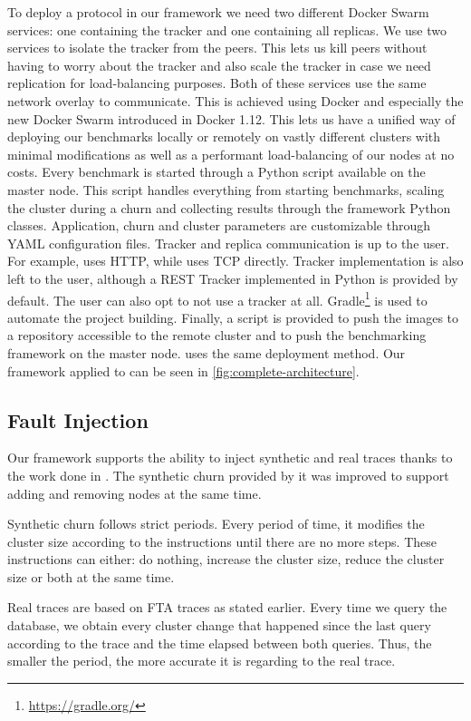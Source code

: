 To deploy a protocol in our framework we need two different Docker Swarm services: one containing the tracker and one containing all replicas. We use two services to isolate the tracker from the peers. This lets us kill peers without having to worry about the tracker and also scale the tracker in case we need replication for load-balancing purposes. Both of these services use the same network overlay to communicate. This is achieved using Docker and especially the new Docker Swarm introduced in Docker 1.12. This lets us have a unified way of deploying our benchmarks locally or remotely on vastly different clusters with minimal modifications as well as a performant load-balancing of our nodes at no costs. Every benchmark is started through a Python script available on the master node. This script handles everything from starting benchmarks, scaling the cluster during a churn and collecting results through the framework Python classes. Application, churn and cluster  parameters are customizable through YAML configuration files. Tracker and replica communication is up to the user. For example, \epto uses HTTP, while \jgroups uses TCP directly. Tracker implementation is also left to the user, although a REST Tracker implemented in Python is provided by default. The user can also opt to not use a tracker at all.
Gradle\footnote{\href{https://gradle.org/}{https://gradle.org/}} is used to automate the project building. Finally, a script is provided to push the images to a repository accessible to the remote cluster and to push the benchmarking framework on the master node. \jgroups uses the same deployment method. Our framework applied to \epto can be seen in \autoref{fig:complete-architecture}.
\subsection{Fault Injection}
Our framework supports the ability to inject synthetic and real traces thanks to the work done in \autocite{vaucher2016erasure}. The synthetic churn provided by it was improved to support adding and removing nodes at the same time.

Synthetic churn follows strict periods. Every period of time, it modifies the cluster size according to the instructions until there are no more steps. These instructions can either: do nothing, increase the cluster size, reduce the cluster size or both at the same time.

Real traces are based on FTA traces as stated earlier. Every time we query the database, we obtain every cluster change that happened since the last query according to the trace and the time elapsed between both queries. Thus, the smaller the period, the more accurate it is regarding to the real trace.
